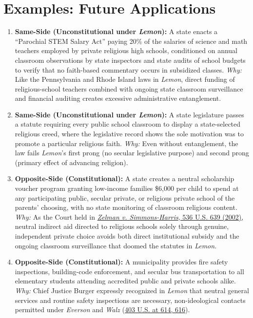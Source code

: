 \documentclass[12pt]{article}
\begin{document}
\section{Examples: Future Applications}
\begin{enumerate}
\item \textbf{Same-Side (Unconstitutional under \textit{Lemon}):} A state enacts a ``Parochial STEM Salary Act'' paying 20\% of the salaries of science and math teachers employed by private religious high schools, conditioned on annual classroom observations by state inspectors and state audits of school budgets to verify that no faith-based commentary occurs in subsidized classes. \textit{Why:} Like the Pennsylvania and Rhode Island laws in \textit{Lemon}, direct funding of religious-school teachers combined with ongoing state classroom surveillance and financial auditing creates excessive administrative entanglement.
\item \textbf{Same-Side (Unconstitutional under \textit{Lemon}):} A state legislature passes a statute requiring every public school classroom to display a state-selected religious creed, where the legislative record shows the sole motivation was to promote a particular religious faith. \textit{Why:} Even without entanglement, the law fails \textit{Lemon}'s first prong (no secular legislative purpose) and second prong (primary effect of advancing religion).
\item \textbf{Opposite-Side (Constitutional):} A state creates a neutral scholarship voucher program granting low-income families \$6,000 per child to spend at any participating public, secular private, or religious private school of the parents' choosing, with no state monitoring of classroom religious content. \textit{Why:} As the Court held in \href{https://supreme.justia.com/cases/federal/us/536/639/}{\textit{Zelman v. Simmons-Harris}, 536 U.S. 639 (2002)}, neutral indirect aid directed to religious schools solely through genuine, independent private choice avoids both direct institutional subsidy and the ongoing classroom surveillance that doomed the statutes in \textit{Lemon}.
\item \textbf{Opposite-Side (Constitutional):} A municipality provides fire safety inspections, building-code enforcement, and secular bus transportation to all elementary students attending accredited public and private schools alike. \textit{Why:} Chief Justice Burger expressly recognized in \textit{Lemon} that neutral general services and routine safety inspections are necessary, non-ideological contacts permitted under \textit{Everson} and \textit{Walz} (\href{https://supreme.justia.com/cases/federal/us/403/602/}{403 U.S. at 614, 616}).

\end{enumerate}
\end{document}
